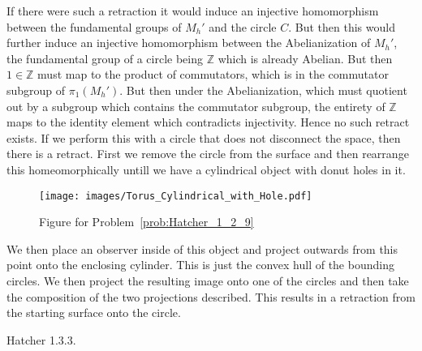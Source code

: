 \documentclass{book}                                                           %
\begin{document}
\begin{solution}
    If there were such a retraction it would induce an injective
    homomorphism between the fundamental groups of $M_{h}'$ and the circle
    $C$. But then this would further induce an injective homomorphism
    between the Abelianization of $M_{h}'$, the fundamental group of a
    circle being $\mathbb{Z}$ which is already Abelian. But then
    $1\in\mathbb{Z}$ must map to the product of commutators, which is in the
    commutator subgroup of $\pi_{1}(M_{h}')$. But then under the
    Abelianization, which must quotient out by a subgroup which contains the
    commutator subgroup, the entirety of $\mathbb{Z}$ maps to the identity
    element which contradicts injectivity. Hence no such retract exists. If
    we perform this with a circle that does not disconnect the space, then
    there is a retract. First we remove the circle from the surface and then
    rearrange this homeomorphically untill we have a cylindrical object with
    donut holes in it.
    \begin{figure}[H]
        \centering
        \captionsetup{type=figure}
        \texttt{[image: images/Torus\_Cylindrical\_with\_Hole.pdf]}
        \caption{Figure for Problem~\ref{prob:Hatcher_1_2_9}}
        \label{fig:Hatcher_1_2_9}
    \end{figure}
    We then place an observer inside of this object and project outwards
    from this point onto the enclosing cylinder. This is just the convex
    hull of the bounding circles. We then project the resulting image onto
    one of the circles and then take the composition of the two projections
    described. This results in a retraction from the starting surface onto
    the circle.
\end{solution}
\begin{problem}
    Hatcher 1.3.3.
\end{problem}
\end{document}
